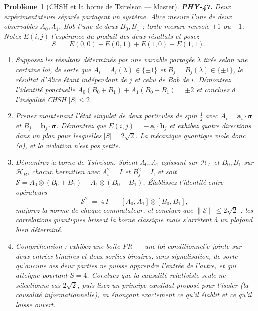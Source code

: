 \documentclass[11pt]{article}
\newtheorem{problem}{Problème}
\begin{document}
\begin{problem}[{CHSH et la borne de Tsirelson --- Master}]
\textbf{PHY-47.} Deux expérimentateurs séparés partagent un système. Alice mesure l'une de deux
observables $A_0, A_1$, Bob l'une de deux $B_0, B_1$ ; toute mesure renvoie $+1$ ou $-1$.
Notez $E(i,j)$ l'espérance du produit des deux résultats et posez
\[ S \;=\; E(0,0) + E(0,1) + E(1,0) - E(1,1). \]
\begin{enumerate}
\item[(a)] Supposez les résultats déterminés par une variable partagée $\lambda$ tirée selon une
certaine loi, de sorte que $A_i = A_i(\lambda) \in \{\pm 1\}$ et
$B_j = B_j(\lambda) \in \{\pm 1\}$, le résultat d'Alice étant indépendant de $j$ et celui de
Bob de $i$. Démontrez l'identité ponctuelle $A_0(B_0+B_1) + A_1(B_0-B_1) = \pm 2$ et concluez
à l'inégalité CHSH $|S| \le 2$.
\item[(b)] Prenez maintenant l'état singulet de deux particules de spin $\tfrac12$ avec
$A_i = \mathbf{a}_i\cdot\boldsymbol{\sigma}$ et $B_j = \mathbf{b}_j\cdot\boldsymbol{\sigma}$.
Démontrez que $E(i,j) = -\,\mathbf{a}_i\cdot\mathbf{b}_j$ et exhibez quatre directions dans un
plan pour lesquelles $|S| = 2\sqrt{2}$. La mécanique quantique viole donc (a), et la violation
n'est pas petite.
\item[(c)] Démontrez la borne de Tsirelson. Soient $A_0,A_1$ agissant sur $\mathcal{H}_A$ et
$B_0,B_1$ sur $\mathcal{H}_B$, chacun hermitien avec $A_i^2 = I$ et $B_j^2 = I$, et soit
$\mathcal{S} = A_0\otimes(B_0+B_1) + A_1\otimes(B_0-B_1)$. Établissez l'identité entre
opérateurs
\[ \mathcal{S}^{2} \;=\; 4\,I \;-\; [A_0,A_1]\otimes[B_0,B_1], \]
majorez la norme de chaque commutateur, et concluez que
$\lVert\mathcal{S}\rVert \le 2\sqrt{2}$ : les corrélations quantiques brisent la borne
classique mais s'arrêtent à un plafond bien déterminé.
\item[(d)] Compréhension : exhibez une \og{} boîte PR \fg{} --- une loi conditionnelle jointe sur deux entrées
binaires et deux sorties binaires, sans signalisation, de sorte qu'aucune des deux parties ne
puisse apprendre l'entrée de l'autre, et qui atteigne pourtant $S = 4$. Concluez que la
causalité relativiste seule ne sélectionne pas $2\sqrt{2}$, puis lisez un principe candidat
proposé pour l'isoler (la causalité informationnelle), en énonçant exactement ce qu'il établit et
ce qu'il laisse ouvert.
\end{enumerate}

\end{problem}
\end{document}
